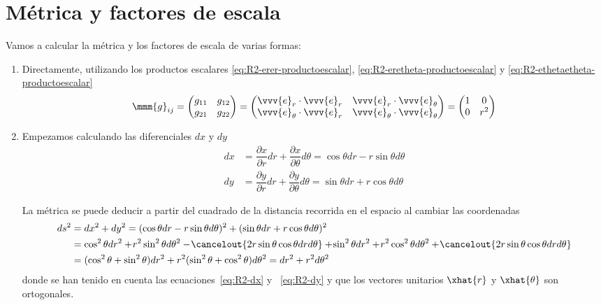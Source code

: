 \section{Métrica y factores de escala}
Vamos a calcular la métrica y los factores de escala de varias formas:
\begin{enumerate}
\item Directamente, utilizando los productos escalares
  \eqref{eq:R2-erer-productoescalar}, \eqref{eq:R2-eretheta-productoescalar} y
   \eqref{eq:R2-ethetaetheta-productoescalar}
  \begin{equation}\label{eq:R2-metrica-polares}
    \mmm{g}_{ij}
    = \begin{pmatrix}
      g_{11} & g_{12}\\
      g_{21} & g_{22}
      \end{pmatrix}
    = \begin{pmatrix}
      \vvv{e}_r\cdot\vvv{e}_r & \vvv{e}_r\cdot\vvv{e}_\theta\\
      \vvv{e}_\theta\cdot\vvv{e}_r & \vvv{e}_\theta\cdot\vvv{e}_\theta
    \end{pmatrix}
    = \begin{pmatrix}
      1 & 0\\
      0 & r^2
    \end{pmatrix}
  \end{equation}
  
\item Empezamos calculando las diferenciales $dx$ y $dy$
  \begin{subequations}
    \begin{align}\label{eq:R2-dx}
      dx
      &=
        \dfrac{\partial x}{\partial r} dr + \dfrac{\partial x}{\partial\theta} d\theta
        = \cos\theta dr - r\sin\theta d\theta\\
      \label{eq:R2-dy}
      dy
      &=
        \dfrac{\partial y}{\partial r} dr + \dfrac{\partial y}{\partial\theta} d\theta
        = \sin\theta dr + r\cos\theta d\theta
    \end{align}
  \end{subequations}

La métrica se puede deducir a partir del cuadrado de la distancia recorrida en el
espacio al cambiar las coordenadas
{\footnotesize
  \begin{align*}
    ds^2
    &=
      dx^2 + dy^2
      = (\cos\theta dr - r\sin\theta d\theta)^2
      + (\sin\theta dr + r\cos\theta d\theta)^2\\
    &=
      \cos^2\theta dr^2
      + \!r^2\sin^2\theta d\theta^2
      - \!\cancelout{2r\sin\theta \cos\theta dr d\theta}
      + \!\sin^2\theta dr^2
      + \!r^2 \cos^2\theta d\theta^2
      + \!\cancelout{2r\sin\theta \cos\theta dr d\theta}\\
    &=
      (\cos^2\theta + \sin^2\theta) dr^2 + r^2(\sin^2\theta + \cos^2\theta) d\theta^2
      = dr^2 + r^2 d\theta^2
  \end{align*}
}
donde se han tenido en cuenta las ecuaciones~\eqref{eq:R2-dx} y ~\eqref{eq:R2-dy} y que
los vectores unitarios $\xhat{r}$ y $\xhat{\theta}$ son ortogonales.


\end{enumerate}
